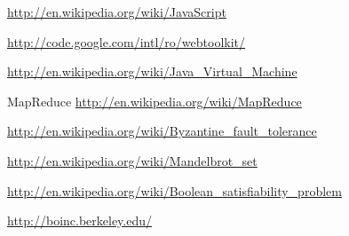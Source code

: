 \documentclass[letterpaper,twocolumn,10pt]{article}
\begin{document}
\begin{thebibliography}{99}

  \url{http://en.wikipedia.org/wiki/JavaScript}

  \url{http://code.google.com/intl/ro/webtoolkit/}
  
  \url{http://en.wikipedia.org/wiki/Java_Virtual_Machine}

  MapReduce \url{http://en.wikipedia.org/wiki/MapReduce}

  \url{http://en.wikipedia.org/wiki/Byzantine_fault_tolerance}

  \url{http://en.wikipedia.org/wiki/Mandelbrot_set}

  \url{http://en.wikipedia.org/wiki/Boolean_satisfiability_problem}
  
  \url{http://boinc.berkeley.edu/}

\end{thebibliography}
\end{document}
